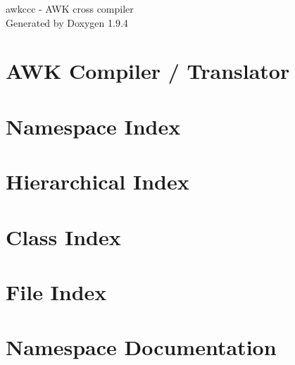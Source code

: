 \documentclass[twoside]{book}
\newcommand{\+}{\discretionary{\mbox{\scriptsize$\hookleftarrow$}}{}{}}
\newcommand{\clearemptydoublepage}{%
    \newpage{\pagestyle{empty}\cleardoublepage}%
  }
\begin{document}
  \raggedbottom
    \hypersetup{pageanchor=false,
                bookmarksnumbered=true,
                pdfencoding=unicode
               }
  \begin{titlepage}
  \vspace*{7cm}
  \begin{center}%
  {\Large awkccc -\/ AWK cross compiler}\\
  \vspace*{1cm}
  {\large Generated by Doxygen 1.9.4}\\
  \end{center}
  \end{titlepage}
  \clearemptydoublepage
  \tableofcontents
  \clearemptydoublepage
  \hypersetup{pageanchor=true}
\chapter{AWK Compiler / Translator}
\label{index}\hypertarget{index}{}
\chapter{Namespace Index}

\chapter{Hierarchical Index}

\chapter{Class Index}

\chapter{File Index}

\chapter{Namespace Documentation}






\end{document}

